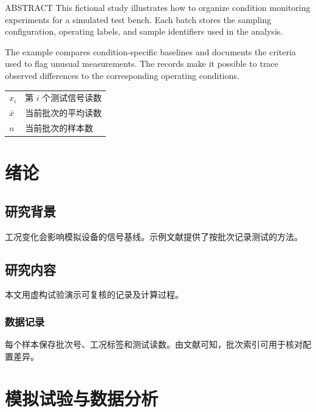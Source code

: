 \documentclass{sdjumthesis}
\begin{document}
\begin{thesisabstract}{\ThesisEnglishTitle}{ABSTRACT}
\setlength\parindent{4\fontdimen2\font}
This fictional study illustrates how to organize condition monitoring experiments for a simulated test bench. Each batch stores the sampling configuration, operating labels, and sample identifiers used in the analysis.

The example compares condition-specific baselines and documents the criteria used to flag unusual measurements. The records make it possible to trace observed differences to the corresponding operating conditions.
\end{thesisabstract}

\tableofcontents
{}
\noindent
\begin{tabular}{@{}ll@{}}
$x_i$ & 第 $i$ 个测试信号读数\\
$\bar{x}$ & 当前批次的平均读数\\
$n$ & 当前批次的样本数
\end{tabular}

\mainmatter
\chapter{绪论}
\section{研究背景}
工况变化会影响模拟设备的信号基线。示例文献提供了按批次记录测试的方法\supercite{local-cn}。
\section{研究内容}
本文用虚构试验演示可复核的记录及计算过程。
\subsection{数据记录}
每个样本保存批次号、工况标签和测试读数。由文献\cite{local-en}可知，批次索引可用于核对配置差异。

\chapter{模拟试验与数据分析}
\end{document}
